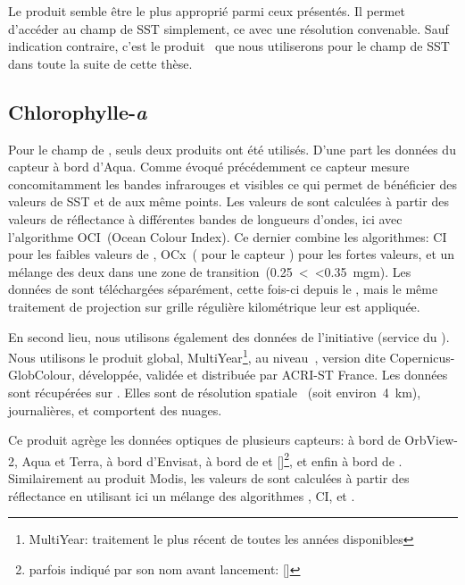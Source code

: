 Le produit  semble être le plus approprié parmi ceux présentés.
Il permet d'accéder au champ de SST simplement, ce avec une résolution convenable.
Sauf indication contraire, c'est le produit~ que nous utiliserons pour le champ de SST dans toute la suite de cette thèse.

\subsection{Chlorophylle-\textit{a}}
\label{sec:donnees-chl}

Pour le champ de , seuls deux produits ont été utilisés.
D'une part les données du capteur  à bord d'Aqua.
Comme évoqué précédemment ce capteur mesure concomitamment les bandes infrarouges et visibles ce qui permet de bénéficier des valeurs de SST et de  aux même points.
Les valeurs de  sont calculées à partir des valeurs de réflectance à différentes bandes de longueurs d'ondes, ici avec l'algorithme OCI~(Ocean Colour Index).
Ce dernier combine les algorithmes: CI pour les faibles valeurs de , OCx~(  pour le capteur ) pour les fortes valeurs, et un mélange des deux dans une zone de transition~(0.25~\textless {}~\textless 0.35~\unit{mgm}).
Les données de  sont téléchargées séparément, cette fois-ci depuis le , mais le même traitement de projection sur grille régulière kilométrique leur est appliquée.

En second lieu, nous utilisons également des données de l'initiative  (service du ).
Nous utilisons le produit global, MultiYear\footnote{%
  MultiYear: traitement le plus récent de toutes les années disponibles
}, au niveau~, version dite Copernicus-GlobColour, développée, validée et distribuée par ACRI-ST France.
Les données sont récupérées sur .
Elles sont de résolution spatiale~ (soit environ~\qty{4}{\km}), journalières, et comportent des nuages.

Ce produit agrège les données optiques de plusieurs capteurs:  à bord de OrbView-2,  Aqua et Terra,  à bord d'Envisat,  à bord de  et []\footnote{parfois indiqué par son nom avant lancement: []}, et enfin  à bord de .
Similairement au produit Modis, les valeurs de  sont calculées à partir des réflectance en utilisant ici un mélange des algorithmes , CI, et .

